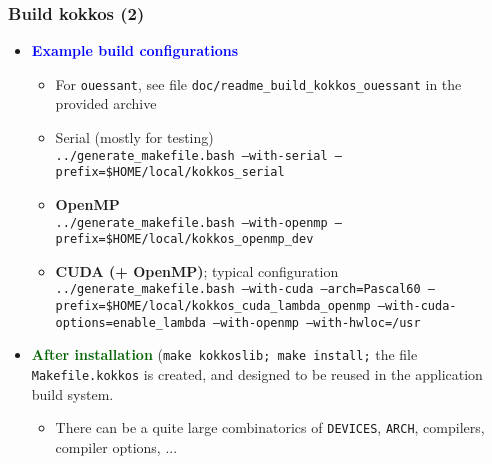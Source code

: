 \begin{frame}
  \frametitle{Build kokkos (2)}

  \begin{itemize}
  \item \textcolor{blue}{\textbf{Example build configurations}}
    \begin{itemize}
    \item For \texttt{ouessant}, see file \texttt{doc/readme\_build\_kokkos\_ouessant} in the provided archive
    \item Serial (mostly for testing)\\
      \texttt{../generate\_makefile.bash --with-serial --prefix=\$HOME/local/kokkos\_serial}
    \item \textbf{OpenMP}\\
      \texttt{../generate\_makefile.bash --with-openmp --prefix=\$HOME/local/kokkos\_openmp\_dev}
    \item \textbf{CUDA (+ OpenMP)}; typical configuration\\
      \texttt{../generate\_makefile.bash --with-cuda --arch=Pascal60 --prefix=\$HOME/local/kokkos\_cuda\_lambda\_openmp --with-cuda-options=enable\_lambda --with-openmp --with-hwloc=/usr}
    \end{itemize}
  \item \textcolor{darkgreen}{\textbf{After installation}} (\texttt{make kokkoslib; make install;} the file \texttt{Makefile.kokkos} is created, and designed to be reused in the application build system.
    \begin{itemize}
    \item There can be a quite large combinatorics of \texttt{DEVICES}, \texttt{ARCH}, compilers, compiler options, ...
    \end{itemize}
  \end{itemize}
  
\end{frame}

